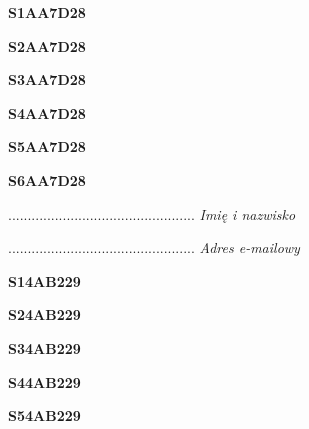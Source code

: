 \begin{turn}{90}\huge \textbf{S1AA7D28}\end{turn}

\begin{turn}{90}\huge \textbf{S2AA7D28}\end{turn}

\begin{turn}{90}\huge \textbf{S3AA7D28}\end{turn}

\begin{turn}{90}\huge \textbf{S4AA7D28}\end{turn}

\begin{turn}{90}\huge \textbf{S5AA7D28}\end{turn}

\begin{turn}{90}\huge \textbf{S6AA7D28}\end{turn}

\begin{turn}{90}\begin{minipage}{\linewidth} \vspace{20mm} ................................................  \textit{Imię i nazwisko}\end{minipage}\end{turn}

\begin{turn}{90}\begin{minipage}{\linewidth} \vspace{20mm} ................................................  \textit{Adres e-mailowy}\end{minipage}\end{turn}

\begin{turn}{90}\huge \textbf{S14AB229}\end{turn}

\begin{turn}{90}\huge \textbf{S24AB229}\end{turn}

\begin{turn}{90}\huge \textbf{S34AB229}\end{turn}

\begin{turn}{90}\huge \textbf{S44AB229}\end{turn}

\begin{turn}{90}\huge \textbf{S54AB229}\end{turn}

